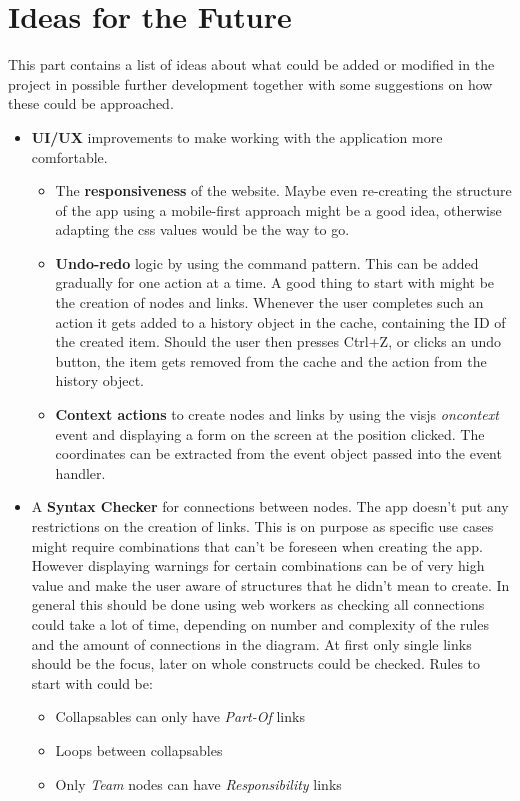 \chapter{Ideas for the Future}
\label{chap:Future}
This part contains a list of ideas about what could be added or modified in the project in possible further development together with some suggestions on how these could be approached.
\begin{itemize}
\item \textbf{UI/UX} improvements to make working with the application more comfortable.
\begin{itemize}
\item The \textbf{responsiveness} of the website. Maybe even re-creating the structure of the app using a mobile-first approach might be a good idea, otherwise adapting the css values would be the way to go.

\item \textbf{Undo-redo} logic by using the command pattern. This can be added gradually for one action at a time. A good thing to start with might be the creation of nodes and links. Whenever the user completes such an action it gets added to a history object in the cache, containing the ID of the created item. Should the user then presses Ctrl+Z, or clicks an undo button, the item gets removed from the cache and the action from the history object.

\item \textbf{Context actions} to create nodes and links by using the visjs \emph{oncontext} event and displaying a form on the screen at the position clicked. The coordinates can be extracted from the event object passed into the event handler.
\end{itemize}

\item A \textbf{Syntax Checker} for connections between nodes. The app doesn't put any restrictions on the creation of links. This is on purpose as specific use cases might require combinations that can't be foreseen when creating the app. However displaying warnings for certain combinations can be of very high value and make the user aware of structures that he didn't mean to create. In general this should be done using web workers as checking all connections could take a lot of time, depending on number and complexity of the rules and the amount of connections in the diagram. At first only single links should be the focus, later on whole constructs could be checked. Rules to start with could be:
\begin{itemize}
\item Collapsables can only have \emph{Part-Of} links
\item Loops between collapsables
\item Only \emph{Team} nodes can have \emph{Responsibility} links
\end{itemize}


\end{itemize}

